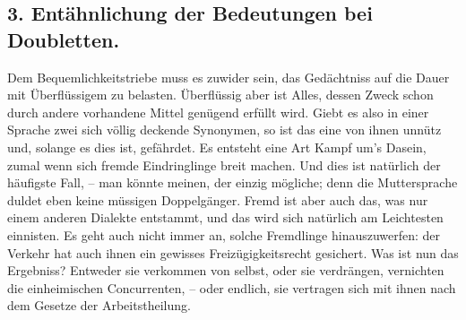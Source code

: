 {\subsection*{3. Entähnlichung der Bedeutungen bei Doubletten.}\label{III.II.II.12.3}
Dem Bequemlichkeitstriebe muss es zuwider sein, das Gedächtniss auf die Dauer mit Überflüssigem zu belasten. Überflüssig aber ist Alles, dessen Zweck schon durch andere vorhandene Mittel genügend erfüllt wird. Giebt es also in einer Sprache zwei sich völlig deckende Synonymen, so ist das eine von ihnen unnütz und, solange es dies ist, gefährdet. Es entsteht  eine Art Kampf um’s Dasein, zumal wenn sich fremde Eindringlinge breit machen. Und dies ist natürlich  der häufigste Fall, – man könnte meinen, der einzig mögliche; denn die Muttersprache duldet eben keine müssigen Doppelgänger. Fremd ist aber auch das, was nur einem anderen Dialekte entstammt, und das wird sich natürlich am Leichtesten einnisten. Es geht auch nicht immer an, solche Fremdlinge hinauszuwerfen: der Verkehr hat auch ihnen ein gewisses Freizügigkeitsrecht gesichert. Was ist nun das Ergebniss? Entweder sie verkommen von selbst, oder sie verdrängen, vernichten die einheimischen Concurrenten, – oder endlich, sie vertragen sich mit ihnen nach dem Gesetze der Arbeitstheilung.

}
